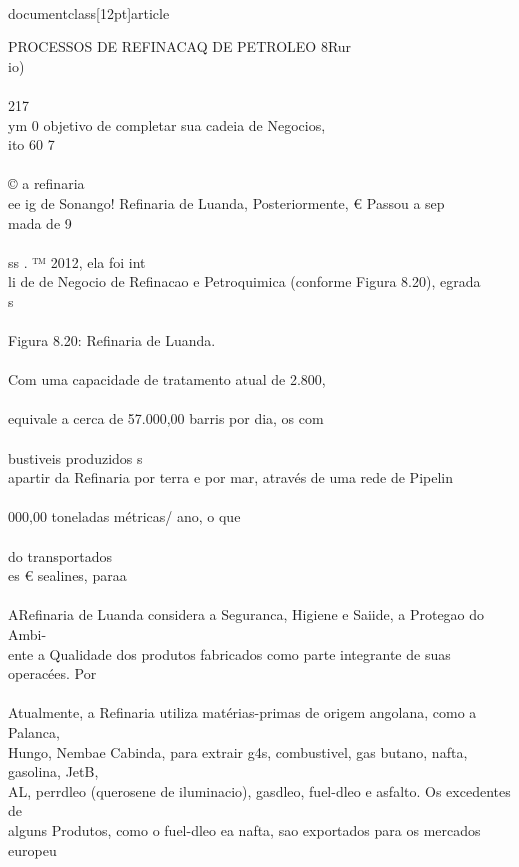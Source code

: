 \\documentclass[12pt]{article}
\begin{document}
PROCESSOS DE REFINACAQ DE PETROLEO 8Rur\\
io)\\
\\
217\\
ym 0 objetivo de completar sua cadeia de Negocios,\\
ito 60 7\\
\\
© a refinaria\\
ee ig de Sonango! Refinaria de Luanda, Posteriormente, € Passou a sep\\
mada de 9\\
\\
ss . ™ 2012, ela foi int\\
li de de Negocio de Refinacao e Petroquimica (conforme Figura 8.20), egrada\\
s\\
\\
Figura 8.20: Refinaria de Luanda.\\
\\
Com uma capacidade de tratamento atual de 2.800,\\
\\
equivale a cerca de 57.000,00 barris por dia, os com\\
\\
bustiveis produzidos s\\
apartir da Refinaria por terra e por mar, através de uma rede de Pipelin\\
\\
000,00 toneladas métricas/ ano, o que\\
\\
do transportados\\
es € sealines, paraa\\
\\
ARefinaria de Luanda considera a Seguranca, Higiene e Saiide, a Protegao do Ambi-\\
ente a Qualidade dos produtos fabricados como parte integrante de suas operacées. Por\\
\\
Atualmente, a Refinaria utiliza matérias-primas de origem angolana, como a Palanca,\\
Hungo, Nembae Cabinda, para extrair g4s, combustivel, gas butano, nafta, gasolina, JetB,\\
AL, perrdleo (querosene de iluminacio), gasdleo, fuel-dleo e asfalto. Os excedentes de\\
alguns Produtos, como o fuel-dleo ea nafta, sao exportados para os mercados europeu\\
\end{document}
